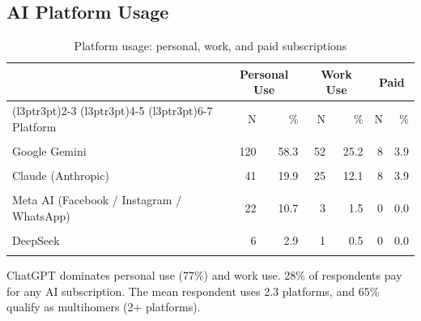 \documentclass[
]{article}
\begin{document}
\subsection{AI Platform Usage}\label{ai-platform-usage}

\begin{longtable}[t]{lrrrrrr}
\caption{\label{tab:tab-platform}Platform usage: personal, work, and paid subscriptions}\\
\toprule
\multicolumn{1}{c}{ } & \multicolumn{2}{c}{Personal Use} & \multicolumn{2}{c}{Work Use} & \multicolumn{2}{c}{Paid} \\
\cmidrule(l{3pt}r{3pt}){2-3} \cmidrule(l{3pt}r{3pt}){4-5} \cmidrule(l{3pt}r{3pt}){6-7}
Platform & N & \% & N & \% & N & \%\\
\midrule
\cellcolor{gray!10}{ChatGPT (OpenAI)} & \cellcolor{gray!10}{159} & \cellcolor{gray!10}{77.2} & \cellcolor{gray!10}{101} & \cellcolor{gray!10}{49.0} & \cellcolor{gray!10}{39} & \cellcolor{gray!10}{18.9}\\
Google Gemini & 120 & 58.3 & 52 & 25.2 & 8 & 3.9\\
\cellcolor{gray!10}{Microsoft Copilot} & \cellcolor{gray!10}{57} & \cellcolor{gray!10}{27.7} & \cellcolor{gray!10}{45} & \cellcolor{gray!10}{21.8} & \cellcolor{gray!10}{5} & \cellcolor{gray!10}{2.4}\\
Claude (Anthropic) & 41 & 19.9 & 25 & 12.1 & 8 & 3.9\\
\cellcolor{gray!10}{Grok (xAI)} & \cellcolor{gray!10}{28} & \cellcolor{gray!10}{13.6} & \cellcolor{gray!10}{8} & \cellcolor{gray!10}{3.9} & \cellcolor{gray!10}{5} & \cellcolor{gray!10}{2.4}\\
\addlinespace
Meta AI (Facebook / Instagram / WhatsApp) & 22 & 10.7 & 3 & 1.5 & 0 & 0.0\\
\cellcolor{gray!10}{Perplexity} & \cellcolor{gray!10}{14} & \cellcolor{gray!10}{6.8} & \cellcolor{gray!10}{6} & \cellcolor{gray!10}{2.9} & \cellcolor{gray!10}{4} & \cellcolor{gray!10}{1.9}\\
DeepSeek & 6 & 2.9 & 1 & 0.5 & 0 & 0.0\\
\cellcolor{gray!10}{Character.AI} & \cellcolor{gray!10}{6} & \cellcolor{gray!10}{2.9} & \cellcolor{gray!10}{0} & \cellcolor{gray!10}{0.0} & \cellcolor{gray!10}{0} & \cellcolor{gray!10}{0.0}\\
\bottomrule
\end{longtable}

ChatGPT dominates personal use (77\%) and work use. 28\% of respondents
pay for any AI subscription. The mean respondent uses 2.3 platforms, and
65\% qualify as multihomers (2+ platforms).
\end{document}
